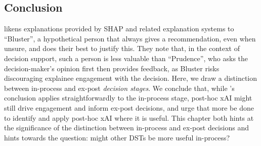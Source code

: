 \subsection{Conclusion}
\textcite{miller_explainable_2023} likens explanations provided by SHAP and related explanation systems to ``Bluster'', a hypothetical person that always gives a recommendation, even when unsure, and does their best to justify this. They note that, in the context of decision support, such a person is less valuable than ``Prudence'', who asks the decision-maker's opinion first then provides feedback, as Bluster risks discouraging explainee engagement with the decision. Here, we draw a distinction between in-process and ex-post \emph{decision stages}. We conclude that, while \textcite{miller_explainable_2023}'s conclusion applies straightforwardly to the in-process stage, post-hoc xAI might still drive engagement and inform ex-post decisions, and urge that more be done to identify and apply post-hoc xAI where it is useful. This chapter both hints at the significance of the distinction between in-process and ex-post decisions and hints towards the question: might other DSTs be more useful in-process?
